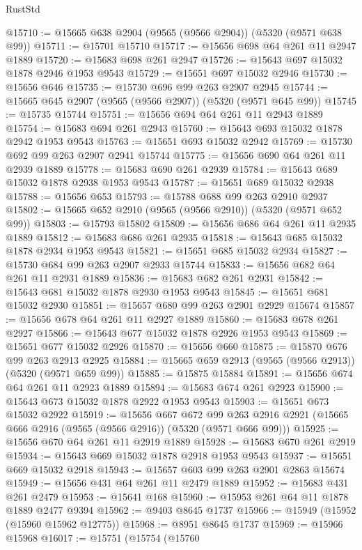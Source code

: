 \begin{lexlean}{RustStd}
\begin{coremodule}
@15710 := @15665 @638 @2904 (@9565 (@9566 @2904)) (@5320 (@9571 @638 @99))
@15711 := @15701 @15710
@15717 := @15656 @698 @64 @261 @11 @2947 @1889
@15720 := @15683 @698 @261 @2947
@15726 := @15643 @697 @15032 @1878 @2946 @1953 @9543
@15729 := @15651 @697 @15032 @2946
@15730 := @15656 @646
@15735 := @15730 @696 @99 @263 @2907 @2945
@15744 := @15665 @645 @2907 (@9565 (@9566 @2907)) (@5320 (@9571 @645 @99))
@15745 := @15735 @15744
@15751 := @15656 @694 @64 @261 @11 @2943 @1889
@15754 := @15683 @694 @261 @2943
@15760 := @15643 @693 @15032 @1878 @2942 @1953 @9543
@15763 := @15651 @693 @15032 @2942
@15769 := @15730 @692 @99 @263 @2907 @2941 @15744
@15775 := @15656 @690 @64 @261 @11 @2939 @1889
@15778 := @15683 @690 @261 @2939
@15784 := @15643 @689 @15032 @1878 @2938 @1953 @9543
@15787 := @15651 @689 @15032 @2938
@15788 := @15656 @653
@15793 := @15788 @688 @99 @263 @2910 @2937
@15802 := @15665 @652 @2910 (@9565 (@9566 @2910)) (@5320 (@9571 @652 @99))
@15803 := @15793 @15802
@15809 := @15656 @686 @64 @261 @11 @2935 @1889
@15812 := @15683 @686 @261 @2935
@15818 := @15643 @685 @15032 @1878 @2934 @1953 @9543
@15821 := @15651 @685 @15032 @2934
@15827 := @15730 @684 @99 @263 @2907 @2933 @15744
@15833 := @15656 @682 @64 @261 @11 @2931 @1889
@15836 := @15683 @682 @261 @2931
@15842 := @15643 @681 @15032 @1878 @2930 @1953 @9543
@15845 := @15651 @681 @15032 @2930
@15851 := @15657 @680 @99 @263 @2901 @2929 @15674
@15857 := @15656 @678 @64 @261 @11 @2927 @1889
@15860 := @15683 @678 @261 @2927
@15866 := @15643 @677 @15032 @1878 @2926 @1953 @9543
@15869 := @15651 @677 @15032 @2926
@15870 := @15656 @660
@15875 := @15870 @676 @99 @263 @2913 @2925
@15884 := @15665 @659 @2913 (@9565 (@9566 @2913)) (@5320 (@9571 @659 @99))
@15885 := @15875 @15884
@15891 := @15656 @674 @64 @261 @11 @2923 @1889
@15894 := @15683 @674 @261 @2923
@15900 := @15643 @673 @15032 @1878 @2922 @1953 @9543
@15903 := @15651 @673 @15032 @2922
@15919 := @15656
    @667
    @672
    @99
    @263
    @2916
    @2921
    (@15665 @666 @2916 (@9565 (@9566 @2916)) (@5320 (@9571 @666 @99)))
@15925 := @15656 @670 @64 @261 @11 @2919 @1889
@15928 := @15683 @670 @261 @2919
@15934 := @15643 @669 @15032 @1878 @2918 @1953 @9543
@15937 := @15651 @669 @15032 @2918
@15943 := @15657 @603 @99 @263 @2901 @2863 @15674
@15949 := @15656 @431 @64 @261 @11 @2479 @1889
@15952 := @15683 @431 @261 @2479
@15953 := @15641 @168
@15960 := @15953 @261 @64 @11 @1878 @1889 @2477 @9394
@15962 := @9403 @8645 @1737
@15966 := @15949 (@15952 (@15960 @15962 @12775))
@15968 := @8951 @8645 @1737
@15969 := @15966 @15968
@16017 := @15751
    (@15754
      (@15760

\end{coremodule}
\end{lexlean}
